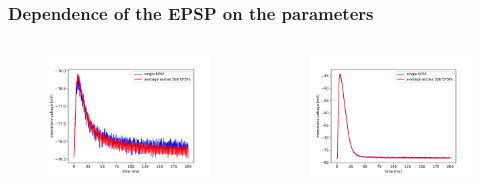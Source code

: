 \documentclass{beamer}
\begin{document}
\begin{frame}
	\frametitle{Dependence of the EPSP on the parameters}
	\begin{columns}
          	\begin{figure}
    				\centering
    				\includegraphics[width=\linewidth]{figures/epsp_fall_+.pdf}
 		   \end{figure}

          \begin{figure}
    				\centering
    				\includegraphics[width=\linewidth]{figures/epsp_fall_-.pdf}
 		   \end{figure}
	\end{columns}
	

\end{frame}
\end{document}
